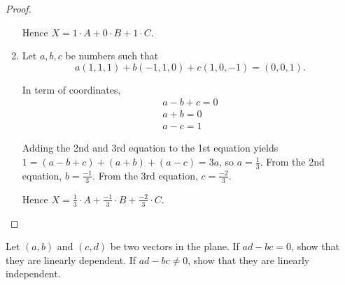 \begin{proof}
\begin{enumerate}[label={(\alph*)},itemsep=0pt]
              Hence $X = 1\cdot A + 0\cdot B + 1\cdot C$.
        \item Let $a, b, c$ be numbers such that
              \[
                  a(1, 1, 1) + b(-1, 1, 0) + c(1, 0, -1) = (0, 0, 1).
              \]

              In term of coordinates,
              \[
                  \begin{split}
                      a - b + c = 0 \\
                      a + b = 0 \\
                      a - c = 1
                  \end{split}
              \]

              Adding the 2nd and 3rd equation to the 1st equation yields $1 = (a - b + c) + (a + b) + (a - c) = 3a$, so $a = \frac{1}{3}$. From the 2nd equation, $b = \frac{-1}{3}$. From the 3rd equation, $c = \frac{-2}{3}$.

              Hence $X = \frac{1}{3}\cdot A + \frac{-1}{3}\cdot B + \frac{-2}{3}\cdot C$.
    \end{enumerate}
\end{proof}

\begin{exercise}
    Let $(a, b)$ and $(c, d)$ be two vectors in the plane. If $ad - bc = 0$, show that they are linearly dependent. If $ad - bc\ne 0$, show that they are linearly independent.
\end{exercise}

